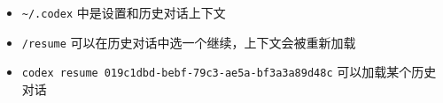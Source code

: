 
\begin{itemize}
\item \verb`~/.codex` 中是设置和历史对话上下文
\item \verb`/resume` 可以在历史对话中选一个继续，上下文会被重新加载
\item \verb`codex resume 019c1dbd-bebf-79c3-ae5a-bf3a3a89d48c` 可以加载某个历史对话
\end{itemize}

